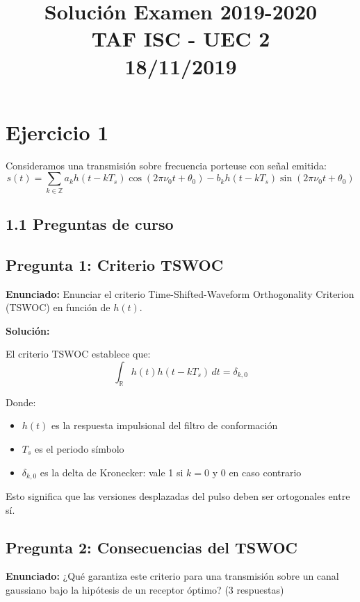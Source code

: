 \documentclass[11pt,a4paper]{article}
\title{\textbf{Soluci\'on Examen 2019-2020\\TAF ISC - UEC 2\\18/11/2019}}
\author{}
\date{}
\begin{document}
\maketitle

\section*{Ejercicio 1}

Consideramos una transmisi\'on sobre frecuencia porteuse con se\~nal emitida:
\[
s(t) = \sum_{k\in\mathbb{Z}} a_k h(t-kT_s)\cos(2\pi\nu_0 t + \theta_0) - b_k h(t-kT_s)\sin(2\pi\nu_0 t + \theta_0)
\]

\subsection*{1.1 Preguntas de curso}

\subsection*{Pregunta 1: Criterio TSWOC}

\textbf{Enunciado:} Enunciar el criterio Time-Shifted-Waveform Orthogonality Criterion (TSWOC) en funci\'on de $h(t)$.

\vspace{0.3cm}
\textbf{Soluci\'on:}

El criterio TSWOC establece que:
\[
\boxed{\int_{\mathbb{R}} h(t) h(t - kT_s)\, dt = \delta_{k,0}}
\]

Donde:
\begin{itemize}
    \item $h(t)$ es la respuesta impulsional del filtro de conformaci\'on
    \item $T_s$ es el periodo s\'imbolo
    \item $\delta_{k,0}$ es la delta de Kronecker: vale 1 si $k=0$ y 0 en caso contrario
\end{itemize}

Esto significa que las versiones desplazadas del pulso deben ser ortogonales entre s\'i.



\subsection*{Pregunta 2: Consecuencias del TSWOC}

\textbf{Enunciado:} ¿Qu\'e garantiza este criterio para una transmisi\'on sobre un canal gaussiano bajo la hip\'otesis de un receptor \'optimo? (3 respuestas)
\end{document}
